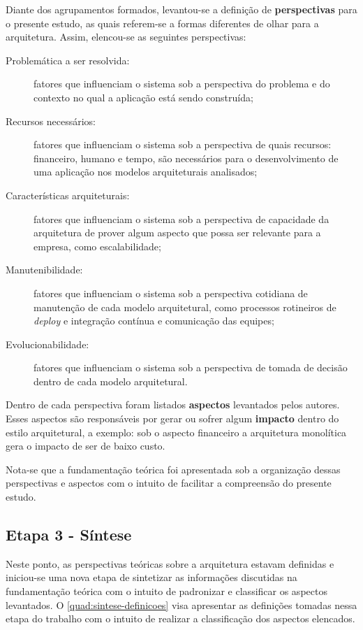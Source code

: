 Diante dos agrupamentos formados, levantou-se a definição de \textbf{perspectivas} para o presente
estudo, as quais referem-se a formas diferentes de olhar para a arquitetura. Assim, elencou-se as
seguintes perspectivas:

\begin{description}
    \item[Problemática a ser resolvida:] fatores que influenciam o sistema sob a perspectiva do
        problema e do contexto no qual a aplicação está sendo construída;
    \item[Recursos necessários:] fatores que influenciam o sistema sob a perspectiva de quais
        recursos: financeiro, humano e tempo, são necessários para o desenvolvimento de uma
        aplicação nos modelos arquiteturais analisados;
    \item[Características arquiteturais:] fatores que influenciam o sistema sob a perspectiva de
        capacidade da arquitetura de prover algum aspecto que possa ser relevante para a empresa,
        como escalabilidade;
    \item[Manutenibilidade:] fatores que influenciam o sistema sob a perspectiva cotidiana de
        manutenção de cada modelo arquitetural, como processos rotineiros de \textit{deploy} e
        integração contínua e comunicação das equipes;
    \item[Evolucionabilidade:] fatores que influenciam o sistema sob a perspectiva de tomada de
        decisão dentro de cada modelo arquitetural.
\end{description}

Dentro de cada perspectiva foram listados \textbf{aspectos} levantados pelos autores. Esses aspectos
são responsáveis por gerar ou sofrer algum \textbf{impacto} dentro do estilo arquitetural, a exemplo:
sob o aspecto financeiro a arquitetura monolítica gera o impacto de ser de baixo custo.

Nota-se que a fundamentação teórica foi apresentada sob a organização dessas perspectivas e aspectos
com o intuito de facilitar a compreensão do presente estudo.

\subsection{Etapa 3 - Síntese}
\label{met:sintese}

Neste ponto, as perspectivas teóricas sobre a arquitetura estavam definidas e iniciou-se uma nova
etapa de sintetizar as informações discutidas na fundamentação teórica com o intuito de padronizar e
classificar os aspectos levantados. O \autoref{quad:sintese-definicoes} visa apresentar as
definições tomadas nessa etapa do trabalho com o intuito de realizar a classificação dos aspectos
elencados.

